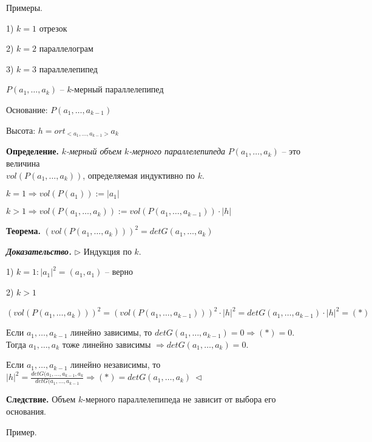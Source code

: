 \vspace{\baselineskip}
Примеры.

1) $k = 1$  отрезок

2) $k = 2$ параллелограм

3) $k = 3$ параллелепипед

\vspace{\baselineskip}
$P(a_1, \dots, a_k)$ -- $k$-мерный параллелепипед

Основание: $P(a_1, \dots, a_{k-1})$

Высота: $h = ort_{<a_1, \dots, a_{k-1}>} a_k$

\vspace{\baselineskip}
\textbf{Определение.} \textit{$k$-мерный объем $k$-мерного параллелепипеда} $P(a_1, \dots, a_k)$ -- это величина \\ $vol(P(a_1, \dots, a_k))$, определяемая индуктивно по $k$.

\vspace{\baselineskip}
$k = 1 \Rightarrow vol(P(a_1)) := |a_1|$

$k > 1 \Rightarrow vol(P(a_1, \dots, a_k)) := vol(P(a_1, \dots, a_{k-1})) \cdot |h|$

\vspace{\baselineskip}
\textbf{Теорема.} $(vol(P(a_1, \dots, a_k)))^2 = det G(a_1, \dots, a_k)$

\vspace{\baselineskip}
\textbf{\textit{Доказательство.}} $\rhd$ Индукция по $k$. 

1) $k = 1: |a_1|^2 = (a_1, a_1)$ -- верно

2) $k > 1$

$(vol(P(a_1, \dots, a_k)))^2 = (vol(P(a_1, \dots, a_{k-1})))^2 \cdot |h|^2 = det G(a_1, \dots, a_{k-1}) \cdot |h|^2 = (*)$

Если $a_1, \dots, a_{k-1}$ линейно зависимы, то $det G(a_1, \dots, a_{k-1}) = 0 \Rightarrow (*) = 0$. Тогда $a_1, \dots, a_k$ тоже линейно зависимы $\Rightarrow det G(a_1, \dots, a_k) = 0$.

Если $a_1, \dots, a_{k-1}$ линейно независимы, то $|h|^2 = \frac{det G(a_1, \dots, a_{k-1}, a_k}{det G(a_1, \dots, a_{k-1}} \Rightarrow (*) = det G(a_1, \dots, a_k) \ \lhd$

\vspace{\baselineskip}
\textbf{Следствие.} Объем $k$-мерного параллелепипеда не зависит от выбора его основания.

\vspace{\baselineskip}
Пример.

